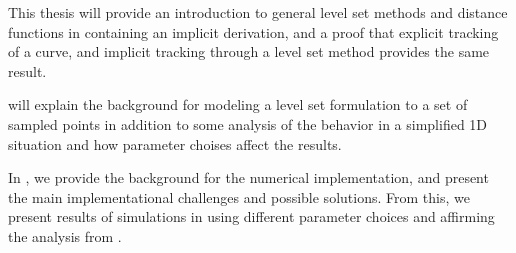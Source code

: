 This thesis will provide an introduction to general level set methods and distance functions in  containing an implicit derivation, and a proof that explicit tracking of a curve, and implicit tracking through a level set method provides the same result.

 will explain the background for modeling a level set formulation to a set of sampled points in addition to some analysis of the behavior in a simplified 1D situation and how parameter choises affect the results.

In , we provide the background for the numerical implementation, and present the main implementational challenges and possible solutions. From this, we present results of simulations in  using different parameter choices and affirming the analysis from .

